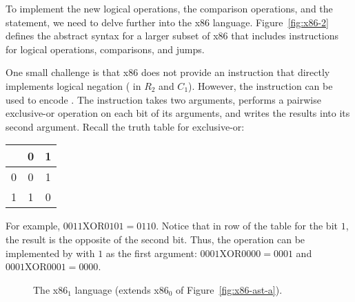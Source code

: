 \documentclass[11pt]{book}
\newcommand{\gray}[1]{{\color{lightgray} #1}}
\begin{document}
To implement the new logical operations, the comparison operations,
and the  statement, we need to delve further into the x86
language. Figure~\ref{fig:x86-2} defines the abstract syntax for a
larger subset of x86 that includes instructions for logical
operations, comparisons, and jumps.

One small challenge is that x86 does not provide an instruction that
directly implements logical negation ( in $R_2$ and $C_1$).
However, the  instruction can be used to encode .
The  instruction takes two arguments, performs a pairwise
exclusive-or operation on each bit of its arguments, and writes the
results into its second argument.  Recall the truth table for
exclusive-or:
\begin{center}
\begin{tabular}{l|cc}
   & 0 & 1 \\ \hline
0  & 0 & 1 \\
1  & 1 & 0
\end{tabular}
\end{center}
For example, $0011 \mathrel{\mathrm{XOR}} 0101 = 0110$.  Notice that
in row of the table for the bit $1$, the result is the opposite of the
second bit.  Thus, the  operation can be implemented by
 with $1$ as the first argument: $0001
\mathrel{\mathrm{XOR}} 0000 = 0001$ and $0001 \mathrel{\mathrm{XOR}}
0001 = 0000$.

\begin{figure}[tp]
\fbox{
\begin{minipage}{0.96\textwidth}
\[
\begin{array}{lcl}
\Arg &::=&  \gray{\INT{\Int} \mid \REG{\itm{register}}
    \mid (\key{deref}\,\itm{register}\,\Int)} \\
     &\mid& (\key{byte-reg}\; \itm{register}) \\
\itm{cc} & ::= & \key{e} \mid \key{l} \mid \key{le} \mid \key{g} \mid \key{ge} \\
\Instr &::=& \gray{(\key{addq} \; \Arg\; \Arg) \mid
             (\key{subq} \; \Arg\; \Arg) \mid
             (\key{negq} \; \Arg) \mid (\key{movq} \; \Arg\; \Arg)} \\
      &\mid& \gray{(\key{callq} \; \mathit{label}) \mid
             (\key{pushq}\;\Arg) \mid
             (\key{popq}\;\Arg) \mid
             (\key{retq})} \\
       &\mid& (\key{xorq} \; \Arg\;\Arg)
       \mid (\key{cmpq} \; \Arg\; \Arg) \mid (\key{set}\;\itm{cc} \; \Arg) \\
       &\mid& (\key{movzbq}\;\Arg\;\Arg)
       \mid  (\key{jmp} \; \itm{label})
       \mid (\key{jmp-if}\; \itm{cc} \; \itm{label}) \\
       &\mid& (\key{label} \; \itm{label}) \\
x86_1 &::= & (\key{program} \;\itm{info} \;(\key{type}\;\itm{type})\; \Instr^{+})
\end{array}
\]
\end{minipage}
}
\caption{The x86$_1$ language (extends x86$_0$ of Figure~\ref{fig:x86-ast-a}).}
\label{fig:x86-1}
\end{figure}
\end{document}
